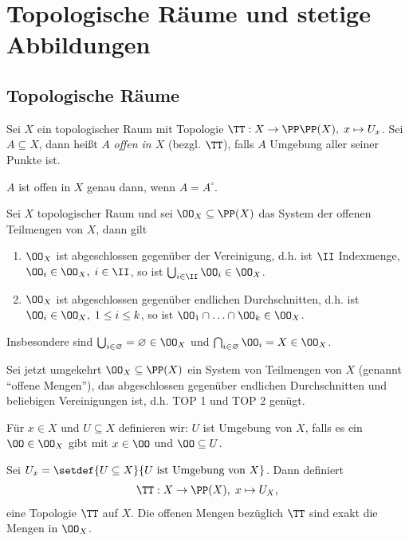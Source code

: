 \section{Topologische Räume und stetige Abbildungen}

\subsection{Topologische Räume}

\begin{defnn}
Sei $X$ ein topologischer Raum mit Topologie $\TT: X\to\PP\PP(X),\;x\mapsto
U_x$. Sei $A\subseteq X$, dann heißt $A$ \emph{offen in $X$} (bezgl. $\TT$),
falls $A$ Umgebung aller seiner Punkte ist.\fishhere
\end{defnn}

\begin{prop}
\label{prop:1.1.1}
$A$ ist offen in $X$ genau dann, wenn $A = A^\circ$.\fishhere
\end{prop}

\begin{prop}
\label{prop:1.1.2}
Sei $X$ topologischer Raum und sei $\OO_X\subseteq \PP(X)$ das System der
offenen Teilmengen von $X$, dann gilt
\begin{enumerate}[label=TOP \arabic{*}]
  \item $\OO_X$ ist abgeschlossen gegenüber der Vereinigung, d.h. ist $\II$
  Indexmenge, $\OO_i \in \OO_X,\;i\in \II$, so ist $\bigcup_{i\in\II}
  \OO_i \in \OO_X$.
  \item $\OO_X$ ist abgeschlossen gegenüber endlichen Durchschnitten,
  d.h. ist $\OO_i \in \OO_X,\; 1\le i\le k$, so ist $\OO_1 \cap \ldots
  \cap \OO_k \in \OO_X$.\fishhere
\end{enumerate}
\end{prop}

\begin{bemn}
Insbesondere sind $\bigcup_{i\in\varnothing} = \varnothing \in \OO_X$ und
$\bigcap_{i\in\varnothing} \OO_i = X \in \OO_X$.\maphere
\end{bemn}
\begin{prop}
\label{prop:1.1.3}
Sei jetzt umgekehrt $\OO_X\subseteq \PP(X)$ ein System von Teilmengen von $X$
(genannt ``offene Mengen''), das abgeschlossen gegenüber endlichen
Durchschnitten und beliebigen Vereinigungen ist, d.h. TOP 1 und TOP 2 genügt.

Für $x\in X$ und $U\subseteq X$ definieren wir: $U$ ist Umgebung von $X$, falls
es ein $\OO\in\OO_X$ gibt mit $x\in\OO$ und $\OO\subseteq U$.

Sei $U_x = \setdef{U\subseteq X}{U\text{ ist Umgebung von } X}$. Dann definiert
\begin{align*}
\TT: X\to\PP(X),\;x\mapsto U_X,
\end{align*}
eine Topologie $\TT$ auf $X$. Die offenen Mengen bezüglich $\TT$ sind exakt die
Mengen in $\OO_X$.\fishhere
\end{prop}

